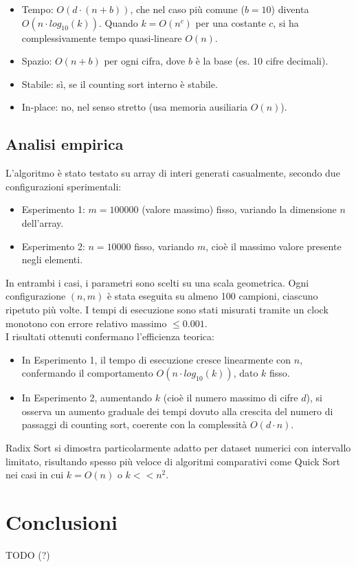 \documentclass[a4paper, 12pt, oneside]{book}
\begin{document}
\begin{itemize}
    \item Tempo: \(O(d \cdot (n + b))\), che nel caso più comune (\(b = 10\)) diventa \(O(n \cdot log_{10}(k))\). Quando \(k = O(n^c)\) per una costante \(c\), si ha complessivamente tempo quasi-lineare \(O(n)\).
    \item Spazio: \(O(n + b)\) per ogni cifra, dove \(b\) è la base (es. 10 cifre decimali).
    \item Stabile: sì, se il counting sort interno è stabile.
    \item In-place: no, nel senso stretto (usa memoria ausiliaria \(O(n)\)).
\end{itemize}

\section{Analisi empirica}
L'algoritmo è stato testato su array di interi generati casualmente, secondo due configurazioni sperimentali:

\begin{itemize}
    \item Esperimento 1: \(m = 100000\) (valore massimo) fisso, variando la dimensione \(n\) dell'array.
    \item Esperimento 2: \(n = 10000\) fisso, variando \(m\), cioè il massimo valore presente negli elementi.
\end{itemize}

\noindent In entrambi i casi, i parametri sono scelti su una scala geometrica. Ogni configurazione \((n, m)\) è stata eseguita su almeno 100 campioni, ciascuno ripetuto più volte. I tempi di esecuzione sono stati misurati tramite un clock monotono con errore relativo massimo \(\leq 0.001\). \\

\noindent I risultati ottenuti confermano l'efficienza teorica:

\begin{itemize}
    \item In Esperimento 1, il tempo di esecuzione cresce linearmente con \(n\), confermando il comportamento \(O(n \cdot log_{10}(k))\), dato \(k\) fisso.
    \item In Esperimento 2, aumentando \(k\) (cioè il numero massimo di cifre \(d\)), si osserva un aumento graduale dei tempi dovuto alla crescita del numero di passaggi di counting sort, coerente con la complessità \(O(d \cdot n)\).
\end{itemize}

\noindent Radix Sort si dimostra particolarmente adatto per dataset numerici con intervallo limitato, risultando spesso più veloce di algoritmi comparativi come Quick Sort nei casi in cui \(k = O(n)\) o \(k << n^2\).


\chapter{Conclusioni}\label{chap:Conclusioni} %

TODO (?)

\end{document}
